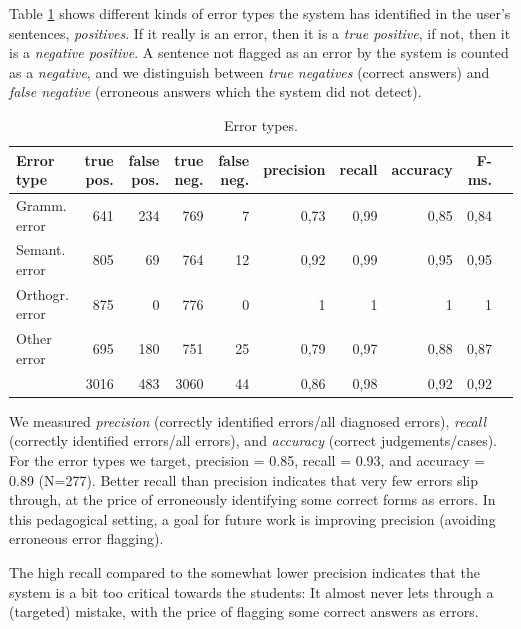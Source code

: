 \documentclass[11pt]{article}
\begin{document}
Table \ref{errortypes} shows different kinds of error types the system has identified in the user's sentences, \textit{positives}. If it really is an error, then it is a \textit{true positive}, if not, then it is a \textit{negative positive}. A sentence not flagged as an error by the system is counted as a \textit{negative}, and we distinguish between \textit{true negatives} (correct answers) and \textit{false negative} (erroneous answers which the system did not detect). \\

\begin{table}[hbtp]
\begin{center}
\begin{tabular}{|l|r|r|r|r||r|r|r|r|r|}
\hline
Error type	& true pos.		& false pos.		& true neg.		& false neg.	& precision	 & recall	& accuracy	& F-ms. \\
\hline
Gramm. error    &   641   &   234   &   769    &   7    &   0,73   &   0,99   &   0,85   &   0,84	  \\
Semant. error       &   805   &   69    &   764    &   12   &   0,92   &   0,99   &   0,95   &   0,95		  \\
Orthogr. error      &   875   &   0     &   776    &   0    &   1      &   1      &   1      &   1					  \\
Other error     &   695   &   180   &   751    &   25   &   0,79   &   0,97   &   0,88   &   0,87	  \\
\hline
  &   3016  &   483   &   3060   &   44   &   0,86   &   0,98   &   0,92   &   0,92			  \\
\hline
\end{tabular}
\caption{Error types.}
\label{errortypes}
\end{center}
\end{table}%

We measured \textit{precision} (correctly identified errors/all diagnosed errors), \textit{recall} (correctly identified errors/all errors), and \textit{accuracy} (correct judgements/cases). For the error types we target, precision = 0.85, recall = 0.93, and accuracy = 0.89 (N=277). Better recall than precision indicates that very few errors slip through, at the price of erroneously identifying some correct forms as errors. In this pedagogical setting, a goal for future work is improving precision (avoiding erroneous error flagging).

The high recall compared to the somewhat lower precision indicates that the system is a bit too critical towards the students: It almost never lets through a (targeted) mistake, with the price of flagging some correct answers as errors.
 
\end{document}
